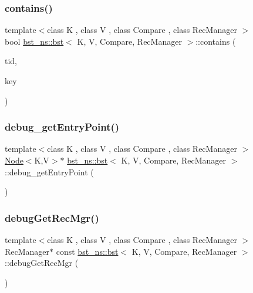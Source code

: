 \subsubsection{\texorpdfstring{contains()}{contains()}}
{\footnotesize\ttfamily template$<$class K , class V , class Compare , class Rec\+Manager $>$ \\
bool \hyperlink{classbst__ns_1_1bst}{bst\+\_\+ns\+::bst}$<$ K, V, Compare, Rec\+Manager $>$\+::contains (\begin{DoxyParamCaption}\item[{const int}]{tid,  }\item[{const K \&}]{key }\end{DoxyParamCaption})}

\mbox{\label{classbst__ns_1_1bst_a037981db7b5b0451d9d429fbffb51209}} 
\subsubsection{\texorpdfstring{debug\+\_\+get\+Entry\+Point()}{debug\_getEntryPoint()}}
{\footnotesize\ttfamily template$<$class K , class V , class Compare , class Rec\+Manager $>$ \\
\hyperlink{classbst__ns_1_1Node}{Node}$<$K,V$>$$\ast$ \hyperlink{classbst__ns_1_1bst}{bst\+\_\+ns\+::bst}$<$ K, V, Compare, Rec\+Manager $>$\+::debug\+\_\+get\+Entry\+Point (\begin{DoxyParamCaption}{ }\end{DoxyParamCaption})\hspace{0.3cm}{\ttfamily [inline]}}

\mbox{\label{classbst__ns_1_1bst_acb9992d1e5f6bdf91d6437ea08244614}} 
\subsubsection{\texorpdfstring{debug\+Get\+Rec\+Mgr()}{debugGetRecMgr()}}
{\footnotesize\ttfamily template$<$class K , class V , class Compare , class Rec\+Manager $>$ \\
Rec\+Manager$\ast$ const \hyperlink{classbst__ns_1_1bst}{bst\+\_\+ns\+::bst}$<$ K, V, Compare, Rec\+Manager $>$\+::debug\+Get\+Rec\+Mgr (\begin{DoxyParamCaption}{ }\end{DoxyParamCaption})\hspace{0.3cm}{\ttfamily [inline]}}

